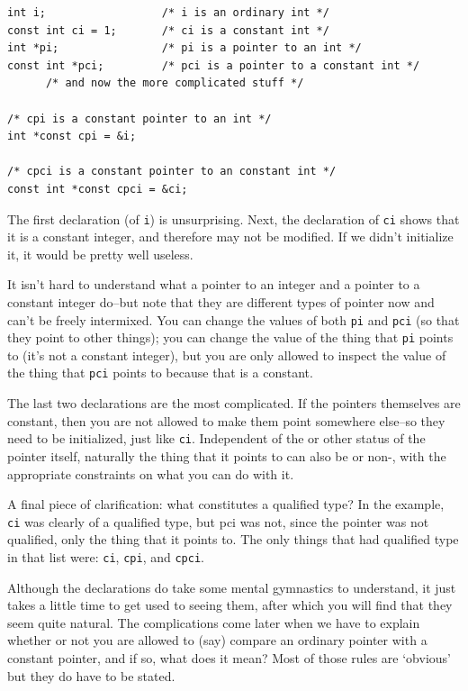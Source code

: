    \begin{Verbatim}
int i;                  /* i is an ordinary int */
const int ci = 1;       /* ci is a constant int */
int *pi;                /* pi is a pointer to an int */
const int *pci;         /* pci is a pointer to a constant int */
      /* and now the more complicated stuff */

/* cpi is a constant pointer to an int */
int *const cpi = &i;

/* cpci is a constant pointer to an constant int */
const int *const cpci = &ci;
\end{Verbatim}

   The first declaration (of \texttt{i}) is unsurprising. Next, the
    declaration of \texttt{ci} shows that it is a constant integer, and
    therefore may not be modified. If we didn't initialize it, it would be
    pretty well useless.


   It isn't hard to understand what a pointer to an integer and a pointer
    to a constant integer do--but note that they are different types of
    pointer now and can't be freely intermixed. You can change the values of
    both \texttt{pi} and \texttt{pci} (so that they point to other
    things); you can change the value of the thing that \texttt{pi}
    points to (it's not a constant integer), but you are only allowed to
    inspect the value of the thing that \texttt{pci} points to because
    that is a constant.


   The last two declarations are the most complicated. If the pointers
    themselves are constant, then you are not allowed to make them point
    somewhere else--so they need to be initialized, just like
    \texttt{ci}. Independent of the \const{} or other status
    of the pointer itself, naturally the thing that it points to can also be
    \const{} or non-\const, with the appropriate
    constraints on what you can do with it.


   A final piece of clarification: what constitutes a qualified type? In
    the example, \texttt{ci} was clearly of a qualified type, but pci
    was not, since the pointer was not qualified, only the thing that it
    points to. The only things that had qualified type in that list were:
    \texttt{ci}, \texttt{cpi}, and \texttt{cpci}.


   Although the declarations do take some mental gymnastics to
    understand, it just takes a little time to get used to seeing them,
    after which you will find that they seem quite natural. The
    complications come later when we have to explain whether or not you are
    allowed to (say) compare an ordinary pointer with a constant pointer,
    and if so, what does it mean? Most of those rules are `obvious'
    but they do have to be stated.


